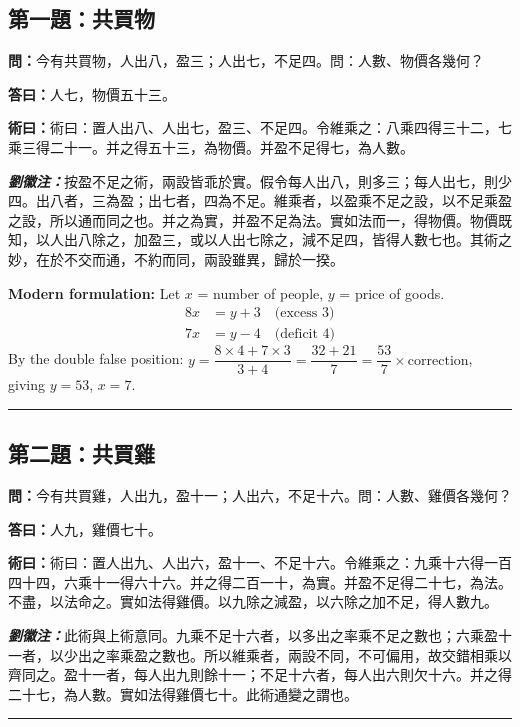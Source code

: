\documentclass[11pt,a4paper]{article}
\newcommand{\wen}[1]{\textbf{\color{problemcolor}問：}#1\par}
\newcommand{\da}[1]{\textbf{答曰：}#1\par}
\newcommand{\shu}[1]{\textbf{術曰：}#1\par}
\newcommand{\liuhui}[1]{{\color{commentarycolor}\textit{\textbf{劉徽注：}}#1\par}}
\begin{document}
\subsection{第一題：共買物}

\wen{今有共買物，人出八，盈三；人出七，不足四。問：人數、物價各幾何？}

\da{人七，物價五十三。}

\shu{術曰：置人出八、人出七，盈三、不足四。令維乘之：八乘四得三十二，七乘三得二十一。并之得五十三，為物價。并盈不足得七，為人數。}

\liuhui{按盈不足之術，兩設皆乖於實。假令每人出八，則多三；每人出七，則少四。出八者，三為盈；出七者，四為不足。維乘者，以盈乘不足之設，以不足乘盈之設，所以通而同之也。并之為實，并盈不足為法。實如法而一，得物價。物價既知，以人出八除之，加盈三，或以人出七除之，減不足四，皆得人數七也。其術之妙，在於不交而通，不約而同，兩設雖異，歸於一揆。}

\textbf{Modern formulation:}
Let $x$ = number of people, $y$ = price of goods.
\begin{align*}
8x &= y + 3 \quad\text{(excess 3)}\\
7x &= y - 4 \quad\text{(deficit 4)}
\end{align*}
By the double false position: $y = \dfrac{8 \times 4 + 7 \times 3}{3+4} = \dfrac{32+21}{7} = \dfrac{53}{7} \times \text{correction}$, giving $y = 53$, $x = 7$.

\bigskip
\hrule
\bigskip

\subsection{第二題：共買雞}

\wen{今有共買雞，人出九，盈十一；人出六，不足十六。問：人數、雞價各幾何？}

\da{人九，雞價七十。}

\shu{術曰：置人出九、人出六，盈十一、不足十六。令維乘之：九乘十六得一百四十四，六乘十一得六十六。并之得二百一十，為實。并盈不足得二十七，為法。不盡，以法命之。實如法得雞價。以九除之減盈，以六除之加不足，得人數九。}

\liuhui{此術與上術意同。九乘不足十六者，以多出之率乘不足之數也；六乘盈十一者，以少出之率乘盈之數也。所以維乘者，兩設不同，不可偏用，故交錯相乘以齊同之。盈十一者，每人出九則餘十一；不足十六者，每人出六則欠十六。并之得二十七，為人數。實如法得雞價七十。此術通變之謂也。}

\bigskip
\hrule
\bigskip

\end{document}
